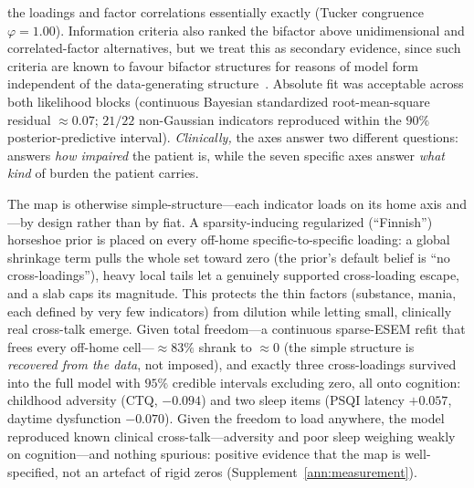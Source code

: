the loadings and factor correlations essentially exactly (Tucker congruence $\varphi = 1.00$).
Information criteria also ranked the bifactor above unidimensional and correlated-factor
alternatives, but we treat this as secondary evidence, since such criteria are known to favour
bifactor structures for reasons of model form independent of the data-generating
structure~\citep{bonifaycai2017,greene2019fit}. Absolute fit was
acceptable across both likelihood blocks (continuous Bayesian standardized
root-mean-square residual $\approx 0.07$; $21/22$ non-Gaussian indicators reproduced
within the $90\%$ posterior-predictive interval). \emph{Clinically,} the axes answer two
different questions: \Gfac{} answers \emph{how impaired} the patient is, while the seven
specific axes answer \emph{what kind} of burden the patient carries.

The map is otherwise simple-structure---each indicator loads on its home axis and
\Gfac{}---by design rather than by fiat. A sparsity-inducing regularized (``Finnish'')
horseshoe prior is placed on every off-home specific-to-specific loading: a global
shrinkage term pulls the whole set toward zero (the prior's default belief is ``no
cross-loadings''), heavy local tails let a genuinely supported cross-loading escape,
and a slab caps its magnitude. This protects the thin factors (substance, mania, each
defined by very few indicators) from dilution while letting small, clinically real
cross-talk emerge. Given total freedom---a continuous sparse-ESEM refit that frees
every off-home cell---$\approx 83\%$ shrank to $\approx 0$ (the simple structure is
\emph{recovered from the data}, not imposed), and exactly three cross-loadings survived into the full
model with $95\%$ credible intervals excluding zero, all onto cognition: childhood
adversity (CTQ, $-0.094$) and two sleep items (PSQI latency $+0.057$, daytime
dysfunction $-0.070$). Given the freedom to load anywhere, the model reproduced known
clinical cross-talk---adversity and poor sleep weighing weakly on cognition---and
nothing spurious: positive evidence that the map is well-specified, not an artefact of
rigid zeros (Supplement~\ref{ann:measurement}).

